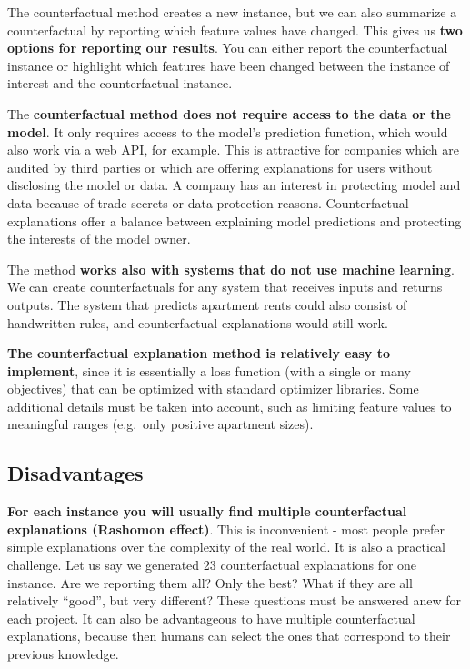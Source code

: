 \documentclass[
  12pt,
]{krantz}
\begin{document}
The counterfactual method creates a new instance, but we can also summarize a counterfactual by reporting which feature values have changed.
This gives us \textbf{two options for reporting our results}.
You can either report the counterfactual instance or highlight which features have been changed between the instance of interest and the counterfactual instance.

The \textbf{counterfactual method does not require access to the data or the model}.
It only requires access to the model's prediction function, which would also work via a web API, for example.
This is attractive for companies which are audited by third parties or which are offering explanations for users without disclosing the model or data.
A company has an interest in protecting model and data because of trade secrets or data protection reasons.
Counterfactual explanations offer a balance between explaining model predictions and protecting the interests of the model owner.

The method \textbf{works also with systems that do not use machine learning}.
We can create counterfactuals for any system that receives inputs and returns outputs.
The system that predicts apartment rents could also consist of handwritten rules, and counterfactual explanations would still work.

\textbf{The counterfactual explanation method is relatively easy to implement}, since it is essentially a loss function (with a single or many objectives) that can be optimized with standard optimizer libraries.
Some additional details must be taken into account, such as limiting feature values to meaningful ranges (e.g.~only positive apartment sizes).

\hypertarget{disadvantages-14}{%
\subsection{Disadvantages}\label{disadvantages-14}}

\textbf{For each instance you will usually find multiple counterfactual explanations (Rashomon effect)}.
This is inconvenient - most people prefer simple explanations over the complexity of the real world.
It is also a practical challenge.
Let us say we generated 23 counterfactual explanations for one instance.
Are we reporting them all?
Only the best?
What if they are all relatively ``good'', but very different?
These questions must be answered anew for each project.
It can also be advantageous to have multiple counterfactual explanations, because then humans can select the ones that correspond to their previous knowledge.
\end{document}
